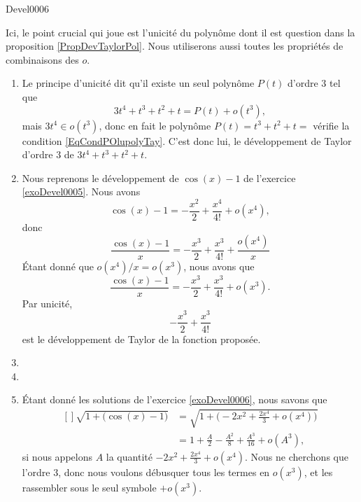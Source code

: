 
\begin{corrige}{Devel0006}

Ici, le point crucial qui joue est l'unicité du polynôme dont il est question dans la proposition \ref{PropDevTaylorPol}. Nous utiliserons aussi toutes les propriétés de combinaisons des $o$.
\begin{enumerate}

\item
Le principe d'unicité dit qu'il existe un seul polynôme $P(t)$ d'ordre $3$ tel que
\begin{equation}	\label{EqCondPOlupolyTay}
	3t^4+t^3+t^2+t=P(t)+o(t^3),
\end{equation}
	mais $3t^4\in o(t^3)$, donc en fait le polynôme $P(t)=t^3+t^2+t=$ vérifie la condition \eqref{EqCondPOlupolyTay}. C'est donc lui, le développement de Taylor d'ordre $3$ de $3t^4+t^3+t^2+t$.


\item
Nous reprenons le développement de $\cos(x)-1$ de l'exercice \ref{exoDevel0005}. Nous avons
\begin{equation}
	\cos(x)-1=-\frac{ x^2 }{ 2 }+\frac{ x^4 }{ 4! }+o(x^4),
\end{equation}
donc
\begin{equation}
	\frac{ \cos(x)-1}{x}=-\frac{ x^3 }{ 2 }+\frac{ x^3 }{ 4! }+\frac{ o(x^4)}{x}
\end{equation}
Étant donné que $o(x^4)/x=o(x^3)$, nous avons que
\begin{equation}
	\frac{ \cos(x)-1}{x}=-\frac{ x^3 }{ 2 }+\frac{ x^3 }{ 4! }+o(x^3).
\end{equation}
Par unicité,
\begin{equation}
	-\frac{ x^3 }{ 2 }+\frac{ x^3 }{ 4! }
\end{equation}
est le développement de Taylor de la fonction proposée.

\item
\item
\item
Étant donné les solutions de l'exercice \ref{exoDevel0006}, nous savons que
\begin{equation}
	\begin{aligned}[]
		\sqrt{1+\big( \cos(x)-1 \big)}
			&=\sqrt{1+\big( -2x^2+\frac{ 2x^4 }{ 3 }+o(x^4) \big)}\\
			&=1+\frac{ A }{2}-\frac{ A^2 }{ 8 }+\frac{ A^3 }{ 16 }+o(A^3),
	\end{aligned}
\end{equation}
si nous appelons $A$ la quantité $-2x^2+\frac{ 2x^4 }{ 3 }+o(x^4)$. Nous ne cherchons que l'ordre $3$, donc nous voulons débusquer tous les termes en $o(x^3)$, et les rassembler sous le seul symbole \og $+o(x^3)$\fg.


\end{enumerate}
\end{corrige}

